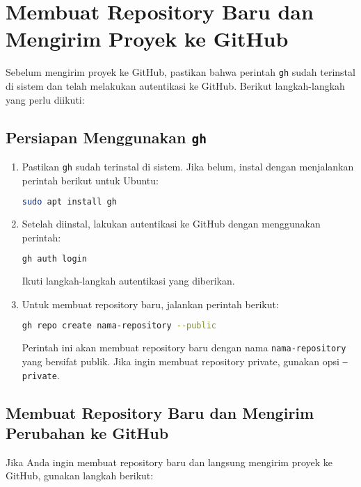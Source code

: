 \section{Membuat Repository Baru dan Mengirim Proyek ke GitHub}

Sebelum mengirim proyek ke GitHub, pastikan bahwa perintah \texttt{gh} sudah terinstal di sistem dan telah melakukan autentikasi ke GitHub. Berikut langkah-langkah yang perlu diikuti:

\subsection{Persiapan Menggunakan \texttt{gh}}

\begin{enumerate}
	\item Pastikan \texttt{gh} sudah terinstal di sistem. Jika belum, instal dengan menjalankan perintah berikut untuk Ubuntu:
	\begin{lstlisting}[language=bash]
		sudo apt install gh
	\end{lstlisting}
	
	\item Setelah diinstal, lakukan autentikasi ke GitHub dengan menggunakan perintah:
	\begin{lstlisting}[language=bash]
		gh auth login
	\end{lstlisting}
	Ikuti langkah-langkah autentikasi yang diberikan.
	
	\item Untuk membuat repository baru, jalankan perintah berikut:
	\begin{lstlisting}[language=bash]
		gh repo create nama-repository --public
	\end{lstlisting}
	Perintah ini akan membuat repository baru dengan nama \texttt{nama-repository} yang bersifat publik. Jika ingin membuat repository private, gunakan opsi \texttt{--private}.
\end{enumerate}

\subsection{Membuat Repository Baru dan Mengirim Perubahan ke GitHub}

Jika Anda ingin membuat repository baru dan langsung mengirim proyek ke GitHub, gunakan langkah berikut:


